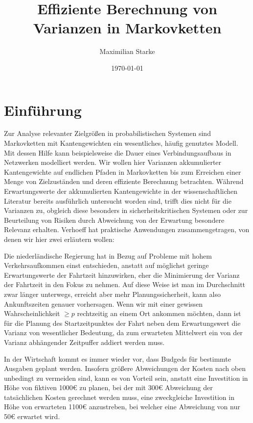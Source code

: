 \documentclass[a4paper]{article}
\title{Effiziente Berechnung von Varianzen in Markovketten}%
\author{Maximilian Starke}
\affil{Fakultät für Informatik, Technische Universität Dresden}
\date{\today}
\theoremstyle{nonumberplain}
\begin{document}
\maketitle
\vspace{6em}
\tableofcontents
\pagebreak

\section{Einführung}

Zur Analyse relevanter Zielgrößen in probabilistischen Systemen sind Markovketten mit Kantengewichten ein wesentliches, häufig genutztes Modell. Mit dessen Hilfe kann beispielsweise die Dauer eines Verbindungsaufbaus in Netzwerken modelliert werden. Wir wollen hier Varianzen akkumulierter Kantengewichte auf endlichen Pfaden in Markovketten bis zum Erreichen einer Menge von Zielzuständen und deren effiziente Berechnung betrachten.
Während Erwartungswerte der akkumulierten Kantengewichte in der wissenschaftlichen Literatur bereits ausführlich untersucht worden sind, trifft dies nicht für die Varianzen zu, obgleich diese besonders in sicherheitskritischen Systemen oder zur Beurteilung von Risiken durch Abweichung von der Erwartung besondere Relevanz erhalten.
Verhoeff \cite{Verh04} hat praktische Anwendungen zusammengetragen, von denen wir hier zwei erläutern wollen:

Die niederländische Regierung hat in Bezug auf Probleme mit hohem Verkehrsaufkommen einst entschieden, anstatt auf möglichst geringe Erwartungswerte der Fahrtzeit hinzuwirken, eher die Minimierung der Varianz der Fahrtzeit in den Fokus zu nehmen. Auf diese Weise ist man im Durchschnitt zwar länger unterwegs, erreicht aber mehr Planungssicherheit, kann also Ankunftszeiten genauer vorhersagen.
Wenn wir mit einer gewissen Wahrscheinlichkeit $\geq p$ rechtzeitig an einem Ort ankommen möchten, dann ist für die Planung des Startzeitpunktes der Fahrt neben dem Erwartungswert die Varianz von wesentlicher Bedeutung, da zum erwarteten Mittelwert ein von der Varianz abhängender Zeitpuffer addiert werden muss.

In der Wirtschaft kommt es immer wieder vor, dass Budgeds für bestimmte Ausgaben geplant werden. Insofern größere Abweichungen der Kosten nach oben unbedingt zu vermeiden sind, kann es von Vorteil sein, anstatt eine Investition in Höhe von fiktiven 1000\euro{} zu planen, bei der mit 300\euro{} Abweichung der tatsächlichen Kosten gerechnet werden muss, eine zweckgleiche Investition in Höhe von erwarteten 1100\euro{} anzustreben, bei welcher eine Abweichung von nur 50\euro{} erwartet wird.
\end{document}
